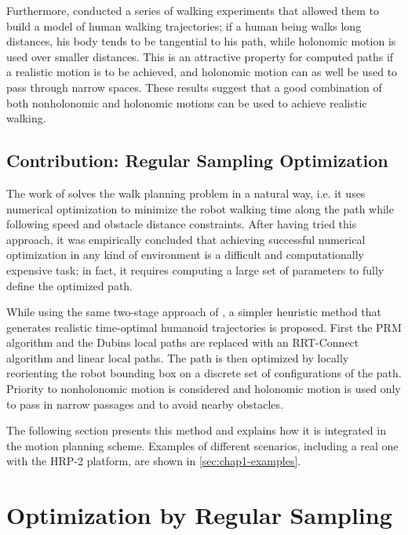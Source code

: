 Furthermore, \cite{momb10} conducted a series of walking experiments
that allowed them to build a model of human walking trajectories; if a
human being walks long distances, his body tends to be tangential to
his path, while holonomic motion is used over smaller distances. This
is an attractive property for computed paths if a realistic motion is
to be achieved, and holonomic motion can as well be used to pass
through narrow spaces. These results suggest that a good combination
of both nonholonomic and holonomic motions can be used to achieve
realistic walking.

\subsection{Contribution: Regular Sampling Optimization}
\label{subsec:chap1-contribution}
The work of \cite{moul10} solves the walk planning problem in a
natural way, i.e. it uses numerical optimization to minimize the robot
walking time along the path while following speed and obstacle
distance constraints. After having tried this approach, it was
empirically concluded that achieving successful numerical optimization
in any kind of environment is a difficult and computationally
expensive task; in fact, it requires computing a large set of
parameters to fully define the optimized path.

While using the same two-stage approach of \cite{yosh08}, a simpler
heuristic method that generates realistic time-optimal humanoid
trajectories is proposed. First the PRM algorithm and the Dubins local
paths are replaced with an RRT-Connect algorithm and linear local
paths. The path is then optimized by locally reorienting the robot
bounding box on a discrete set of configurations of the path. Priority
to nonholonomic motion is considered and holonomic motion is used only
to pass in narrow passages and to avoid nearby obstacles.

The following section presents this method and explains how it is
integrated in the motion planning scheme. Examples of different
scenarios, including a real one with the HRP-2 platform, are shown in
\autoref{sec:chap1-examples}.

\section{Optimization by Regular Sampling}
\label{sec:chap1-regular-sampling-optim}

